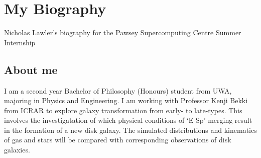 \section{My Biography}

Nicholas Lawler's biography for the Pawsey Supercomputing Centre Summer Internship

\subsection{About me}
I am a second year Bachelor of Philosophy (Honours) student from UWA, majoring in Physics and Engineering.
I am working with Professor Kenji Bekki from ICRAR to explore galaxy transformation from early- to late-types. This involves the investigatation of which physical conditions of `E-Sp’ merging result in the formation of a new disk galaxy. The simulated distributions and kinematics of gas and stars will be compared with corresponding observations of disk galaxies.
